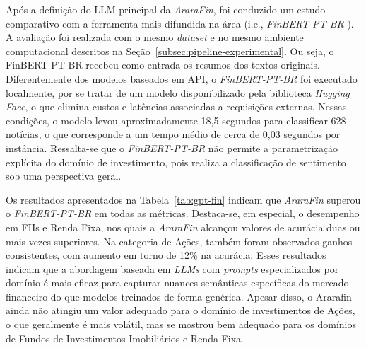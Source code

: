 \documentclass[12pt]{article}
\begin{document}
Após a definição do LLM principal da \textit{AraraFin}, foi conduzido um estudo comparativo com a ferramenta mais difundida na área (i.e., \textit{FinBERT-PT-BR} \cite{santos2023finbert}). A avaliação foi realizada com o mesmo \textit{dataset} e no mesmo ambiente computacional descritos na Seção~\ref{subsec:pipeline-experimental}. Ou seja, o FinBERT-PT-BR recebeu como entrada os resumos dos textos originais. Diferentemente dos modelos baseados em API, o \textit{FinBERT-PT-BR} foi executado localmente, por se tratar de um modelo disponibilizado pela biblioteca \textit{Hugging Face}, o que elimina custos e latências associadas a requisições externas. Nessas condições, o modelo levou aproximadamente 18,5 segundos para classificar 628 notícias, o que corresponde a um tempo médio de cerca de 0,03 segundos por instância. Ressalta-se que o \textit{FinBERT-PT-BR} não permite a parametrização explícita do domínio de investimento, pois realiza a classificação de sentimento sob uma perspectiva geral.

Os resultados apresentados na Tabela~\ref{tab:gpt-fin} indicam que \textit{AraraFin} superou o \textit{FinBERT-PT-BR} em todas as métricas. Destaca-se, em especial, o desempenho em FIIs e Renda Fixa, nos quais a \textit{AraraFin} alcançou valores de acurácia duas ou mais vezes superiores. Na categoria de Ações, também foram observados ganhos consistentes, com aumento em torno de 12\% na acurácia. Esses resultados indicam que a abordagem baseada em \textit{LLMs} com \textit{prompts} especializados por domínio é mais eficaz para capturar nuances semânticas específicas do mercado financeiro do que modelos treinados de forma genérica. Apesar disso, o Ararafin ainda não atingiu um valor adequado para o domínio de investimentos de Ações, o que geralmente é mais volátil, mas se mostrou bem adequado para os domínios de Fundos de Investimentos Imobiliários e Renda Fixa.
\end{document}
